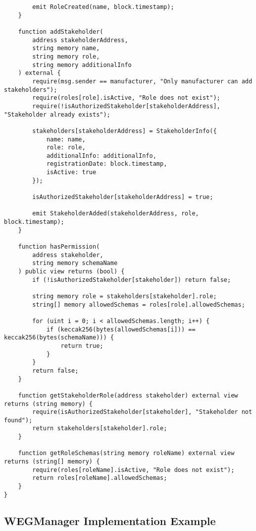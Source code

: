 \documentclass[11pt,a4paper]{article}
\begin{document}
\begin{verbatim}
        emit RoleCreated(name, block.timestamp);
    }
    
    function addStakeholder(
        address stakeholderAddress,
        string memory name,
        string memory role,
        string memory additionalInfo
    ) external {
        require(msg.sender == manufacturer, "Only manufacturer can add stakeholders");
        require(roles[role].isActive, "Role does not exist");
        require(!isAuthorizedStakeholder[stakeholderAddress], "Stakeholder already exists");
        
        stakeholders[stakeholderAddress] = StakeholderInfo({
            name: name,
            role: role,
            additionalInfo: additionalInfo,
            registrationDate: block.timestamp,
            isActive: true
        });
        
        isAuthorizedStakeholder[stakeholderAddress] = true;
        
        emit StakeholderAdded(stakeholderAddress, role, block.timestamp);
    }
    
    function hasPermission(
        address stakeholder,
        string memory schemaName
    ) public view returns (bool) {
        if (!isAuthorizedStakeholder[stakeholder]) return false;
        
        string memory role = stakeholders[stakeholder].role;
        string[] memory allowedSchemas = roles[role].allowedSchemas;
        
        for (uint i = 0; i < allowedSchemas.length; i++) {
            if (keccak256(bytes(allowedSchemas[i])) == keccak256(bytes(schemaName))) {
                return true;
            }
        }
        return false;
    }
    
    function getStakeholderRole(address stakeholder) external view returns (string memory) {
        require(isAuthorizedStakeholder[stakeholder], "Stakeholder not found");
        return stakeholders[stakeholder].role;
    }
    
    function getRoleSchemas(string memory roleName) external view returns (string[] memory) {
        require(roles[roleName].isActive, "Role does not exist");
        return roles[roleName].allowedSchemas;
    }
}
\end{verbatim}

\subsection{WEGManager Implementation Example}
\end{document}
